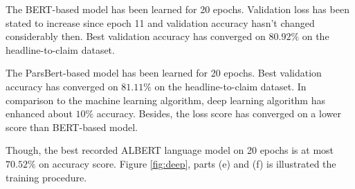 The BERT-based model has been learned for 20 epochs. Validation loss has been stated to increase since epoch 11 and validation accuracy hasn't changed considerably then. Best validation accuracy has converged on $80.92\%$ on the headline-to-claim dataset. 

The ParsBert-based model has been learned for 20 epochs. Best validation accuracy has converged on $81.11\%$ on the headline-to-claim dataset. In comparison to the machine learning algorithm, deep learning algorithm has enhanced about $10\%$ accuracy. Besides, the loss score has converged on a lower score than BERT-based model.

Though, the best recorded ALBERT language model on 20 epochs is at most $70.52\%$ on accuracy score. Figure \ref{fig:deep}, parts (e) and (f) is illustrated the training procedure.

